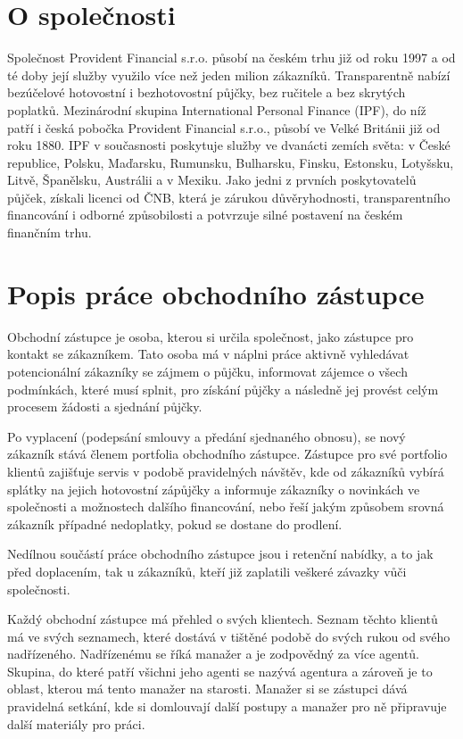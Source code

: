 \documentclass[11pt,twoside,a4paper]{book}
\begin{document}
\section{O společnosti}
Společnost Provident Financial s.r.o. působí na českém trhu již od roku 1997 a od té doby její služby využilo více než jeden milion zákazníků. Transparentně nabízí bezúčelové hotovostní i bezhotovostní půjčky, bez ručitele a bez skrytých poplatků. Mezinárodní skupina International Personal Finance (IPF), do níž patří i česká pobočka Provident Financial s.r.o., působí ve Velké Británii již od roku 1880. IPF v současnosti poskytuje služby ve dvanácti zemích světa: v České republice, Polsku, Maďarsku, Rumunsku, Bulharsku, Finsku, Estonsku, Lotyšsku, Litvě, Španělsku, Austrálii a v Mexiku. Jako jedni z prvních poskytovatelů půjček, získali licenci od ČNB, která je zárukou důvěryhodnosti, transparentního financování i odborné způsobilosti a potvrzuje silné postavení na českém finančním trhu. \cite{provident}

\section{Popis práce obchodního zástupce}
Obchodní zástupce je osoba, kterou si určila společnost, jako zástupce pro kontakt se zákazníkem. Tato osoba má v náplni práce aktivně vyhledávat potencionální zákazníky se zájmem o půjčku, informovat zájemce o všech podmínkách, které musí splnit, pro získání půjčky a následně jej provést celým procesem žádosti a sjednání půjčky. 

Po vyplacení (podepsání smlouvy a předání sjednaného obnosu), se nový zákazník stává členem portfolia obchodního zástupce. Zástupce pro své portfolio klientů zajišťuje servis v podobě pravidelných návštěv, kde od zákazníků vybírá splátky na jejich hotovostní zápůjčky a informuje zákazníky o novinkách ve společnosti a možnostech dalšího financování, nebo řeší jakým způsobem srovná zákazník případné nedoplatky, pokud se dostane do prodlení. 

Nedílnou součástí práce obchodního zástupce jsou i retenční nabídky, a to jak před doplacením, tak u zákazníků, kteří již zaplatili veškeré závazky vůči společnosti.

Každý obchodní zástupce má přehled o svých klientech. Seznam těchto klientů má ve svých seznamech, které dostává v tištěné podobě do svých rukou od svého nadřízeného. Nadřízenému se říká manažer a je zodpovědný za více agentů. Skupina, do které patří všichni jeho agenti se nazývá agentura a zároveň je to oblast, kterou má tento manažer na starosti. Manažer si se zástupci dává pravidelná setkání, kde si domlouvají další postupy a manažer pro ně připravuje další materiály pro práci.
\end{document}
